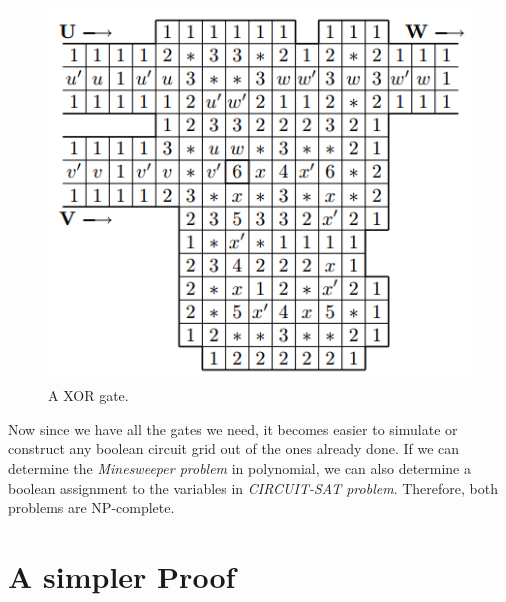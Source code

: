 \documentclass{article}
\begin{document}
\begin{figure}[H]
  \centering
  \includegraphics[scale=.9]{images/xor.png}
  \caption{A XOR gate.}
  \label{fig_xor}
\end{figure}

Now since we have all the gates we need, it becomes easier to simulate or construct any boolean circuit grid out of the ones already done. If we can determine the \textit{Minesweeper problem} in polynomial, we can also determine a boolean assignment to the variables in \textit{CIRCUIT-SAT problem}. Therefore, both problems are NP-complete.


\section{A simpler Proof}
\end{document}
